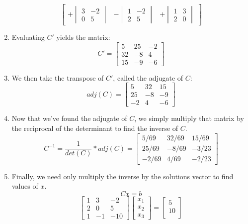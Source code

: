 \documentclass[12pt]{article}
\begin{document}
\begin{enumerate}
\[\begin{bmatrix}
    +\begin{vmatrix}
    3 & -2\\
    0 & 5
    \end{vmatrix} & 
    -\begin{vmatrix}
    1 & -2\\
    2 & 5
    \end{vmatrix} & 
    +\begin{vmatrix}
    1 & 3\\
    2 & 0
    \end{vmatrix}
\end{bmatrix}
\]
\item Evaluating $C'$ yields the matrix:
\[
C' =
\begin{bmatrix}
    5 & 25 & -2 \\
    32 & -8 & 4 \\
    15 & -9 & -6
\end{bmatrix}
\]
\item We then take the transpose of $C'$, called the adjugate of $C$:
\[
adj(C) =
\begin{bmatrix}
    5 & 32 & 15 \\
    25 & -8 & -9 \\
    -2 & 4 & -6
\end{bmatrix}
\]
\item Now that we've found the adjugate of $C$, we simply multiply that matrix by the reciprocal of the determinant to find the inverse of $C$.
\[
C^{-1} = \frac{1}{det(C)} * adj(C) =
\begin{bmatrix}
    5/69 & 32/69 & 15/69 \\
    25/69 & -8/69 & -3/23 \\
    -2/69 & 4/69 & -2/23
\end{bmatrix}
\]
\item Finally, we need only multiply the inverse by the solutions vector to find values of $x$.
\[
Cx = b
\]
\[
\begin{bmatrix}
    1 & 3 & -2 \\
    2 & 0 & 5 \\
    1 & -1 & -10
\end{bmatrix}
\begin{bmatrix}
    x_1 \\
    x_2 \\
    x_3
\end{bmatrix}
=
\begin{bmatrix}
    5 \\
    10 \\

\end{bmatrix}\]
\end{enumerate}
\end{document}
